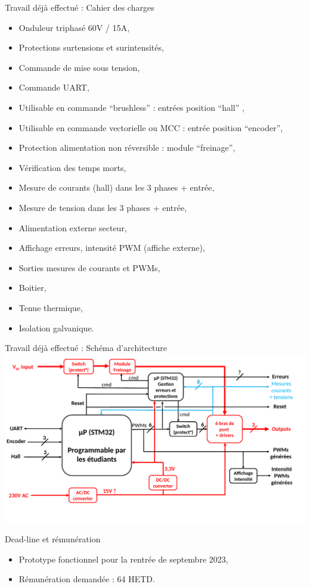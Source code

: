\documentclass[aspectratio=169]{beamer}
\begin{document}
\begin{frame}{Travail déjà effectué : Cahier des charges}
\begin{itemize}
	\item Onduleur triphasé 60V / 15A,
	\item Protections surtensions et surintensités,
	\item Commande de mise sous tension,
	\item Commande UART,
	\item Utilisable en commande ``brushless'' :  entrées position ``hall'' ,
	\item Utilisable en commande vectorielle ou MCC : entrée position ``encoder'',
	\item Protection alimentation non réversible : module ``freinage'',
	\item Vérification des temps morts,
	\item Mesure de courants (hall) dans les 3 phases + entrée,
	\item Mesure de tension dans les 3 phases + entrée,
	\item Alimentation externe secteur,
	\item Affichage erreurs, intensité PWM (affiche externe),
	\item Sorties mesures de courants et PWMs,
	\item Boitier,
	\item Tenue thermique,
	\item Isolation galvanique.
\end{itemize}
\end{frame}

\begin{frame}{Travail déjà effectué : Schéma d'architecture}
\includegraphics[width=\linewidth]{figures/Schema_architecture.pdf} 
\end{frame}

\begin{frame}{Dead-line et rémunération}
\begin{itemize}
	\item Prototype fonctionnel pour la rentrée de septembre 2023,
	\item Rémunération demandée : 64 HETD.
\end{itemize}

\end{frame}
\end{document}
